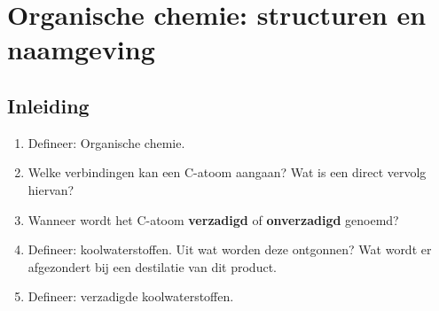 \documentclass[a4paper,12pt]{article}
\begin{document}
    \section{Organische chemie: structuren en naamgeving}
    \subsection*{Inleiding}
    \begin{enumerate}
        \item Defineer: Organische chemie.
        \item Welke verbindingen kan een C-atoom aangaan? Wat is een direct vervolg hiervan? 
        \item Wanneer wordt het C-atoom \textbf{verzadigd} of \textbf{onverzadigd} genoemd?
        \item Defineer: koolwaterstoffen. Uit wat worden deze ontgonnen? Wat wordt er afgezondert bij een destilatie van dit product.
        \item Defineer: verzadigde koolwaterstoffen.
    \end{enumerate}
\end{document}
